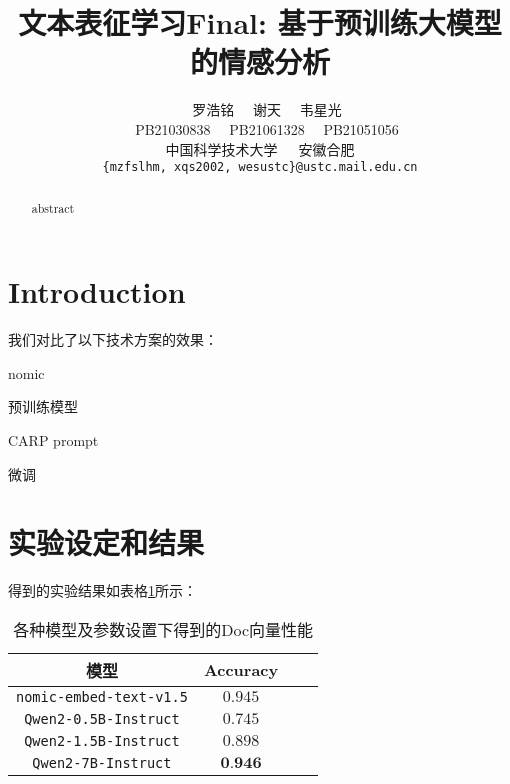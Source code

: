 \documentclass{article}
\title{文本表征学习Final: 基于预训练大模型的情感分析}
\author{
~~{\large 罗浩铭\quad}
~~{\large 谢天\quad}
~~{\large 韦星光\quad}\\
~~{PB21030838}
~~{PB21061328}
~~{PB21051056}\\
中国科学技术大学\ \ \ 安徽合肥\\
{\tt \{mzfslhm, xqs2002, wesustc\}@ustc.mail.edu.cn} \\
}
\begin{document}
\maketitle


\begin{abstract}
  abstract
\end{abstract}








\section{Introduction}
我们对比了以下技术方案的效果：

nomic

预训练模型

CARP prompt

微调

\section{实验设定和结果}

得到的实验结果如表格\ref{tab:pretrained_results}所示：
\begin{table}[htbp]
  \caption{\small{各种模型及参数设置下得到的Doc向量性能}}
  \label{tab:pretrained_results}
  \centering
  \begin{tabular}{cccc}
    \toprule
    模型                   & Accuracy         \\
    \midrule
    \verb|nomic-embed-text-v1.5| & $0.945$          \\
    \midrule
    \verb|Qwen2-0.5B-Instruct| & $0.745$          \\
    \midrule
    \verb|Qwen2-1.5B-Instruct| & $0.898$          \\
    \midrule
    \verb|Qwen2-7B-Instruct| & $\textbf{0.946}$ \\
    \bottomrule
  \end{tabular}
\end{table}
\end{document}
